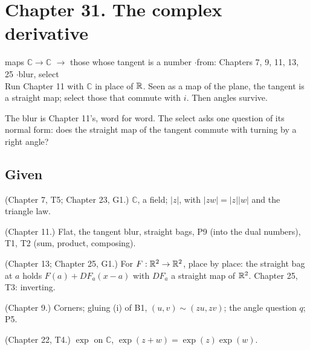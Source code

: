 \newpage

\section*{Chapter 31. The complex derivative}
\begin{center}
{\normalsize maps $\mathbb{C} \to \mathbb{C}$ $\to$ those whose tangent is a number \quad$\cdot$\quad from: Chapters 7, 9, 11, 13, 25 \quad$\cdot$\quad blur, select}\\[4pt]
{\small Run Chapter 11 with $\mathbb{C}$ in place of $\mathbb{R}$. Seen as a map of the plane, the tangent is a straight map; select those that commute with $i$. Then angles survive.}
\end{center}

The blur is Chapter 11's, word for word. The select asks one question of its normal form: does the straight map of the tangent commute with turning by a right angle?

\subsection*{Given}

\begin{lines}
\item[\lab{G1}] (Chapter 7, T5; Chapter 23, G1.) $\mathbb{C}$, a field; $|z|$, with $|zw| = |z||w|$ and the triangle law.
\item[\lab{G2}] (Chapter 11.) Flat, the tangent blur, straight bags, P9 (into the dual numbers), T1, T2 (sum, product, composing).
\item[\lab{G3}] (Chapter 13; Chapter 25, G1.) For $F : \mathbb{R}^2 \to \mathbb{R}^2$, place by place: the straight bag at $a$ holds $F(a) + DF_a(x - a)$ with $DF_a$ a straight map of $\mathbb{R}^2$. Chapter 25, T3: inverting.
\item[\lab{G4}] (Chapter 9.) Corners; gluing (i) of B1, $(u, v) \sim (zu, zv)$; the angle question $q$; P5.
\item[\lab{G5}] (Chapter 22, T4.) $\exp$ on $\mathbb{C}$, $\exp(z + w) = \exp(z)\exp(w)$.
\end{lines}

